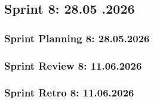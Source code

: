 \subsection{Sprint 8: 28.05 .2026}\label{subsec:sprint-8}

\subsubsection{Sprint Planning 8: 28.05.2026}\label{subsubsec:sprint-planning-8}
\subsubsection{Sprint Review 8: 11.06.2026}\label{subsubsec:sprint-review-8}
\subsubsection{Sprint Retro 8: 11.06.2026}\label{subsubsec:sprint-retro-8}
